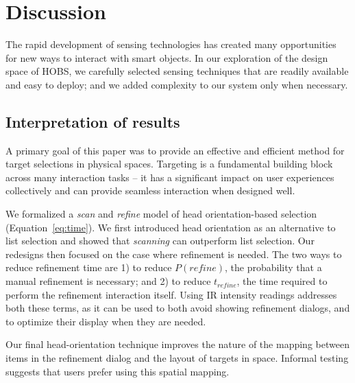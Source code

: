 \section{Discussion}
\label{sec:discussion}
The rapid development of sensing technologies has created many opportunities for new ways to interact with smart objects. In our exploration of the design space of HOBS, we carefully selected sensing techniques that are readily available and easy to deploy; and we added complexity to our system only when necessary. 

\subsection{Interpretation of results}

A primary goal of this paper was to provide an effective and efficient method for target selections in physical spaces. Targeting is a fundamental building block across many interaction tasks -- it has a significant impact on user experiences collectively and can provide seamless interaction when designed well.

We formalized a {\em scan} and {\em refine} model of head orientation-based selection (Equation~\ref{eq:time}). We first introduced head orientation as an alternative to list selection and showed that {\em scanning} can outperform list selection. Our redesigns then focused on the case where refinement is needed. The two ways to reduce refinement time are 1) to reduce $P(refine)$, the probability that a manual refinement is necessary; and 2) to reduce $t_{refine}$, the time required to perform the refinement interaction itself. Using IR intensity readings addresses both these terms, as it can be used to both avoid showing refinement dialogs, and to optimize their display when they are needed. 

Our final head-orientation technique improves the nature of the mapping between items in the refinement dialog and the layout of targets in space. Informal testing suggests that users prefer using this spatial mapping.


